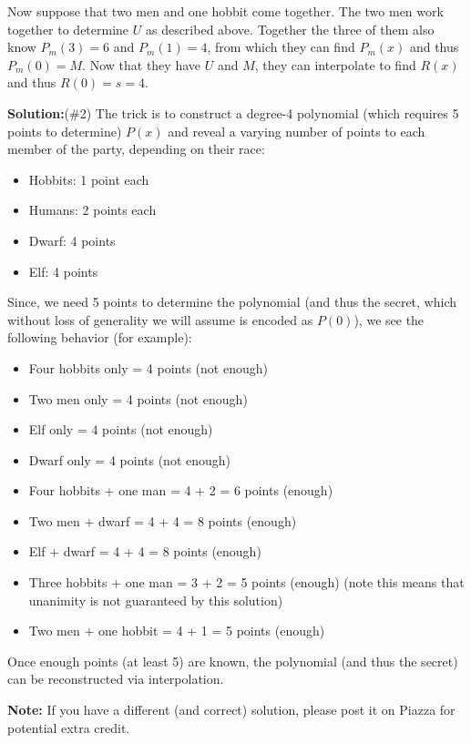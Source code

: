 \documentclass[]{article}
\renewcommand{\answer}[1]{{\color{mydarkblue}\textbf{Solution:}#1}}
\begin{document}
\begin{qunlist}
{{Now suppose that two men and one hobbit come together. The two men work together to determine $U$ as described above. Together the three of them also know $P_m(3)=6$ and $P_m(1)=4$, from which they can find $P_m(x)$ and thus $P_m(0) = M$. Now that they have $U$ and $M$, they can interpolate to find $R(x)$ and thus $R(0) = s = 4$.




\answer (\#2) The trick is to construct a degree-4 polynomial (which requires 5 points to determine) $P(x)$ and reveal a varying number of points to each member of the party, depending on their race:

\begin{itemize}
	\item Hobbits: 1 point each
	\item Humans: 2 points each
	\item Dwarf: 4 points
	\item Elf: 4 points
\end{itemize}

Since, we need 5 points to determine the polynomial (and thus the secret, which without loss of generality we will assume is encoded as $P(0)$), we see the following behavior (for example):
\begin{itemize}
	\item Four hobbits only = 4 points (not enough)
	\item Two men only = 4 points (not enough)
	\item Elf only = 4 points (not enough)
	\item Dwarf only = 4 points (not enough)
	\item Four hobbits + one man = 4 + 2 = 6 points (enough)
	\item Two men + dwarf = 4 + 4 = 8 points (enough)
	\item Elf + dwarf = 4 + 4 = 8 points (enough)
	\item Three hobbits + one man = 3 + 2 = 5 points (enough) (note this means that unanimity is not guaranteed by this solution)
	\item Two men + one hobbit = 4 + 1 = 5 points (enough)
\end{itemize}

Once enough points (at least 5) are known, the polynomial (and thus the secret) can be reconstructed via interpolation.

\textbf{Note:} If you have a different (and correct) solution, please post it on Piazza for potential extra credit.

}}
\end{qunlist}
\end{document}
